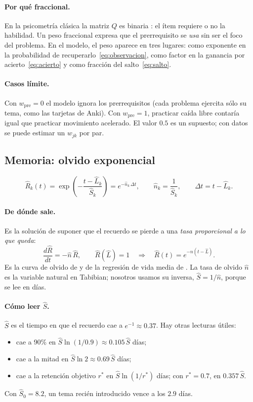 \documentclass[11pt]{article}
\theoremstyle{definition}
\theoremstyle{remark}
\newcommand{\Rh}{\hat R}
\newcommand{\Sh}{\hat S}
\newcommand{\Lh}{\hat L}
\newcommand{\rstar}{r^{\ast}}
\begin{document}
\paragraph{Por qué fraccional.} En la psicometría clásica la matriz $Q$ es binaria \citep{tatsuoka1983}: el ítem requiere o no la habilidad. Un peso fraccional expresa que el prerrequisito se \emph{usa} sin ser el foco del problema. En el modelo, el peso aparece en tres lugares: como exponente en la probabilidad de recuperarlo~\eqref{eq:observacion}, como factor en la ganancia por acierto~\eqref{eq:acierto} y como fracción del salto~\eqref{eq:salto}.

\paragraph{Casos límite.} Con $w_{\mathrm{pre}}=0$ el modelo ignora los prerrequisitos (cada problema ejercita sólo su tema, como las tarjetas de Anki). Con $w_{\mathrm{pre}}=1$, practicar caída libre contaría igual que practicar movimiento acelerado. El valor $0.5$ es un supuesto; con datos se puede estimar un $w_{jk}$ por par.

\subsection{Memoria: olvido exponencial}
\label{sec:memoria}

\begin{equation}
\Rh_k(t)=\exp\!\left(-\frac{t-\Lh_k}{\Sh_k}\right)=e^{-\hat n_k\,\Delta t},\qquad \hat n_k=\frac1{\Sh_k},\qquad \Delta t=t-\Lh_k.
\label{eq:memoria}
\end{equation}

\paragraph{De dónde sale.} Es la solución de suponer que el recuerdo se pierde a una \emph{tasa proporcional a lo que queda}:
\[
\frac{d\Rh}{dt}=-\hat n\,\Rh,\qquad \Rh(\Lh)=1\quad\Longrightarrow\quad \Rh(t)=e^{-\hat n(t-\Lh)}.
\]
Es la curva de olvido de \citet{tabibian2019} y de la regresión de vida media de \citet{settles2016}. La tasa de olvido $\hat n$ es la variable natural en Tabibian; nosotros usamos su inversa, $\Sh=1/\hat n$, porque se lee en días.

\paragraph{Cómo leer $\Sh$.} $\Sh$ es el tiempo en que el recuerdo cae a $e^{-1}\approx0.37$. Hay otras lecturas útiles:
\begin{itemize}
\item cae a 90\% en $\Sh\ln(1/0.9)\approx0.105\,\Sh$ días;
\item cae a la mitad en $\Sh\ln2\approx0.69\,\Sh$ días;
\item cae a la retención objetivo $\rstar$ en $\Sh\ln(1/\rstar)$ días; con $\rstar=0.7$, en $0.357\,\Sh$.
\end{itemize}
Con $\Sh_0=8.2$, un tema recién introducido vence a los $2.9$ días.
\end{document}
